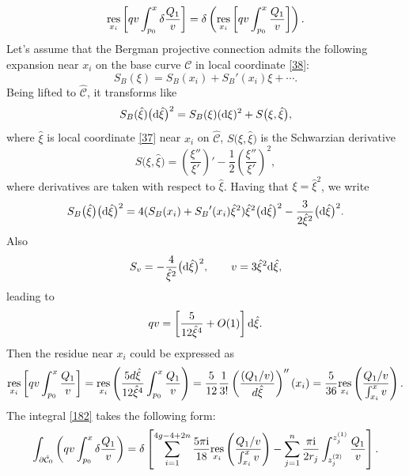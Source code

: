 \documentclass[pdftex]{sigma}
\numberwithin{equation}{section}
\theoremstyle{definition}
\begin{document}
\begin{equation*}
\underset{x_i}{\rm res}\left[qv \int^x_{p_0} \delta\frac{Q_1}{v}\right]
=\delta\left(\underset{x_i}{\rm res}\left[qv \int^x_{p_0} \frac{Q_1}{v}\right]\right). \end{equation*}
Let’s assume that the Bergman projective connection admits the following expansion near $x_i$ on the base curve $\mathcal{C}$ in local coordinate \eqref{38}:
\begin{equation*}S_B(\xi)=S_B (x_i)+{S_B}' (x_i) \xi +\cdots. \end{equation*}
Being lifted to $\hat{\mathcal{C}}$, it transforms like
\begin{equation*}S_B(\hat{\xi})\big({\rm d}\hat{\xi}\big)^2=S_B({\xi})({\rm d}{\xi})^2+S\big({\xi}, \hat{\xi}\big), \end{equation*}
where $\hat{\xi}$ is local coordinate \eqref{37} near $x_i$ on $\hat{\mathcal{C}}$, $S\big({\xi}, \hat{\xi}\big)$ is the Schwarzian derivative
\begin{equation*}
S\big({\xi}, \hat{\xi}\big)=\left(\frac{{\xi}''}{{\xi}'} \right)'-\frac{1}{2}\left(\frac{{\xi}''}{{\xi}'} \right)^2, \end{equation*}
where derivatives are taken with respect to $\hat{\xi}$. Having that ${\xi}=\hat{\xi}^2$, we write
\begin{equation*}
S_B\big(\hat{\xi}\big)\big({\rm d}\hat{\xi}\big)^2=4(S_B (x_i)+{S_B}' (x_i) \hat{\xi}^2)\hat{\xi}^2 \big({\rm d}\hat{\xi} \big)^2-\frac{3}{2\hat{\xi}^2}\big({\rm d}\hat{\xi} \big)^2.\end{equation*}
Also
\begin{equation*}%
S_v=-\frac{4}{\hat{\xi}^2}\big({\rm d}\hat{\xi}\big)^2, \qquad v=3\hat{\xi}^2 {\rm d}\hat{\xi},\end{equation*}
leading to
\begin{equation*}%
qv=\left[\frac{5}{12\hat{\xi}^4}+O(1) \right] {\rm d}\hat{\xi}.
\end{equation*}
Then the residue near $x_i$ could be expressed as
\begin{equation*}%
\underset{x_i}{\rm res}\left[qv \int^x_{p_0} \frac{Q_1}{v}\right]=\underset{x_i}{\rm res} \left(\frac{5d \hat{\xi}}{12\hat{\xi}^4} \int^x_{p_0}\frac{Q_1}{v}\right)=\frac{5}{12}\frac{1}{3!}\left( \frac{(Q_1/v)}{ d\hat{\xi}} \right)''(x_i)=\frac{5}{36}\underset{x_i}{\rm res}\left(\frac{Q_1/v}{\int^x_{x_i}v} \right).
\end{equation*}
The integral \eqref{182} takes the following form:
\begin{equation}\label{pt1}\int_{\partial \hat{\mathcal{C}}_0}\left( qv
\int^x_{p_0} \delta \frac{Q_1}{v}\right)=\delta \left[\sum^{4g-4+2n}_{i=1} \frac{5 \pi{\rm i}}{18}\underset{x_i}{\rm res}\left(\frac{Q_1/v}{\int^x_{x_i}v} \right)-\sum^{n}_{j=1}\frac{\pi{\rm i}}{2{r}_j}\int^{{z}^{(1)}_j}_{{z}^{(2)}_j}\frac{Q_1}{v}\right].\end{equation}
\end{document}
